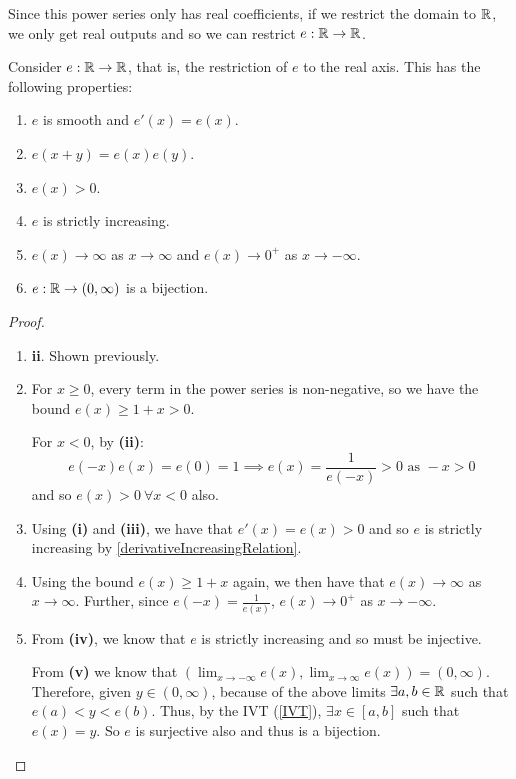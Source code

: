 \documentclass[../main.tex]{subfiles}
\begin{document}
Since this power series only has real coefficients, if we restrict the domain to $\mathbb{R}$, we only get real outputs and so we can restrict $e: \mathbb{R} \to \mathbb{R}$.
\begin{lemma}
  Consider $e: \mathbb{R} \to \mathbb{R}$, that is, the restriction of $e$ to the real axis.
  This has the following properties: \label{eProperties}
  \begin{enumerate}
    \item $e$ is smooth and $e'(x) = e(x)$.
    \item $e(x + y) = e(x)e(y)$.
    \item $e(x) > 0$.
    \item $e$ is strictly increasing.
    \item $e(x) \to \infty$ as $x \to \infty$ and $e(x) \to 0^{+}$ as $x \to - \infty$.
    \item $e: \mathbb{R} \to (0, \infty)$ is a bijection.
  \end{enumerate}
\end{lemma}
\begin{proof}
  \begin{enumerate}
    \item \textbf{ii}. Shown previously. 
    \item For $x \geq 0$, every term in the power series is non-negative, so we have the bound $e(x) \geq 1 + x > 0$.

      For $x < 0$, by \textbf{(ii)}:
      \[
        e(-x)e(x) = e(0) = 1 \implies e(x) = \frac{1}{e(-x)} > 0 \text{ as } -x > 0
      \]
      and so $e(x) > 0\ \forall x < 0$ also.
    \item Using \textbf{(i)} and \textbf{(iii)}, we have that $e'(x) = e(x) > 0$ and so $e$ is strictly increasing by \cref{derivativeIncreasingRelation}.
    \item Using the bound $e(x) \geq 1 + x$ again, we then have that $e(x) \to \infty$ as $x \to \infty$.
      Further, since $e(-x) = \frac{1}{e(x)}$, $e(x) \to 0^{+}$ as $x \to -\infty$.
    \item From \textbf{(iv)}, we know that $e$ is strictly increasing and so must be injective.

      From \textbf{(v)} we know that $(\lim_{x \to -\infty} e(x), \lim_{x \to \infty} e(x)) = (0, \infty)$.
      Therefore, given $y \in (0, \infty)$, because of the above limits $\exists a, b \in \mathbb{R}$ such that $e(a) < y < e(b)$.
      Thus, by the IVT (\cref{IVT}), $\exists x \in [a, b]$ such that $e(x) = y$.
      So $e$ is surjective also and thus is a bijection.
  \end{enumerate}
\end{proof}
\end{document}
